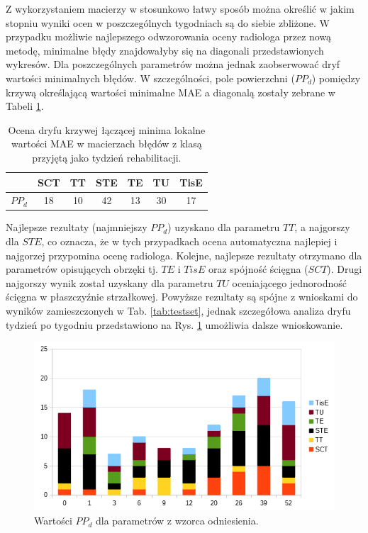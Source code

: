 Z wykorzystaniem macierzy w stosunkowo łatwy sposób można określić w jakim stopniu wyniki ocen w poszczególnych tygodniach są do siebie zbliżone. W przypadku możliwie najlepszego odwzorowania oceny radiologa przez nową metodę, minimalne błędy znajdowałyby się na diagonali przedstawionych wykresów. Dla poszczególnych parametrów można jednak zaobserwować dryf wartości minimalnych błędów. W szczególności, pole powierzchni ($PP_d$) pomiędzy krzywą określającą wartości minimalne MAE a diagonalą zostały zebrane w Tabeli \ref{tab:dryf_meas}. 

\begin{table}[]
	\caption{Ocena dryfu krzywej łączącej minima lokalne wartości MAE w macierzach błędów z klasą przyjętą jako tydzień rehabilitacji.}
	\begin{center}
		\begin{tabular}{l||c|c|c|c|c|c|}
			\hline
			& \textbf{SCT} & \textbf{TT} & \textbf{STE} & \textbf{TE} & \textbf{TU} & \textbf{TisE}\\ 
			\hline
			$PP_d$ &18&10&42&13&30&17\\	
			\hline		
		\end{tabular}
	\end{center}
	\label{tab:dryf_meas}
\end{table}

Najlepsze rezultaty (najmniejszy $PP_d$) uzyskano dla parametru $TT$, a najgorszy dla $STE$, co oznacza, że w tych przypadkach ocena automatyczna najlepiej i najgorzej przypomina ocenę radiologa. Kolejne, najlepsze rezultaty otrzymano dla parametrów opisujących obrzęki tj. $TE$ i $TisE$ oraz spójność ścięgna ($SCT$). Drugi najgorszy wynik został uzyskany dla parametru $TU$ oceniającego jednorodność ścięgna w płaszczyźnie strzałkowej. Powyższe rezultaty są spójne z wnioskami do wyników zamieszczonych w Tab. \ref{tab:testset}, jednak szczegółowa analiza dryfu tydzień po tygodniu przedstawiono na Rys. \ref{fig:CM_MAE_SUMMARY} umożliwia dalsze wnioskowanie.

\begin{figure}[]
	\centering
	\includegraphics[width=1\textwidth]{figures/cm_summary.png}
	\caption{Wartości $PP_d$ dla parametrów z wzorca odniesienia.}\label{fig:CM_MAE_SUMMARY}
\end{figure}

